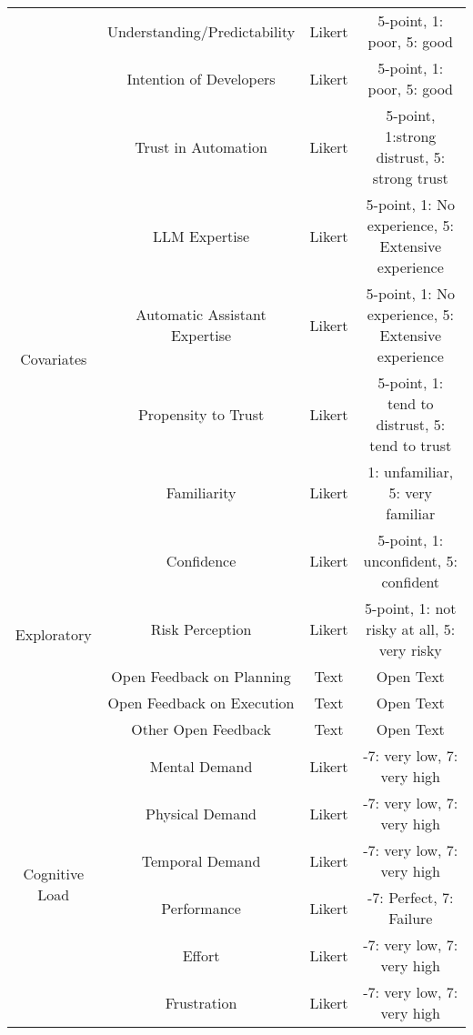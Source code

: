 \begin{table*}[htbp]
\begin{footnotesize}
\begin{tabular}{c | c | c | c}
    & Understanding/Predictability& Likert& 5-point, 1: poor, 5: good\\
    & Intention of Developers& Likert& 5-point, 1: poor, 5: good\\
    & Trust in Automation& Likert& 5-point, 1:strong distrust, 5: strong trust\\
    \hline
     \multirow{4}{*}{Covariates}& LLM Expertise& Likert& 5-point, 1: No experience, 5: Extensive experience\\
     & Automatic Assistant Expertise& Likert& 5-point, 1: No experience, 5: Extensive experience\\
     & Propensity to Trust& Likert& 5-point, 1: tend to distrust, 5: tend to trust \\
     & Familiarity& Likert& 1: unfamiliar, 5: very familiar\\
     \hline
	\multirow{5}{*}{Exploratory}& Confidence& Likert& 5-point, 1: unconfident, 5: confident\\
    & Risk Perception& Likert& 5-point, 1: not risky at all, 5: very risky\\
    & Open Feedback on Planning& Text& Open Text\\
    & Open Feedback on Execution& Text& Open Text\\
    & Other Open Feedback& Text& Open Text\\
	    \hline
     \multirow{6}{*}{{Cognitive Load }}& Mental Demand& Likert& -7: very low, 7: very high\\
	    & Physical Demand& Likert& -7: very low, 7: very high\\
	    & Temporal Demand& Likert& -7: very low, 7: very high\\
	    & Performance& Likert& -7: Perfect, 7: Failure\\
        & Effort& Likert& -7: very low, 7: very high\\
        & Frustration& Likert& -7: very low, 7: very high\\
     \hline
	\end{tabular}
	\end{footnotesize}
\end{table*}

